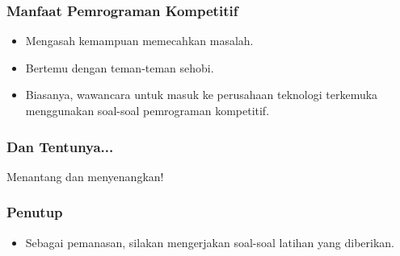 \begin{frame}
\frametitle{Manfaat Pemrograman Kompetitif}
\begin{itemize}
  \item Mengasah kemampuan memecahkan masalah.
  \item Bertemu dengan teman-teman sehobi.
  \item Biasanya, wawancara untuk masuk ke perusahaan teknologi terkemuka menggunakan soal-soal pemrograman kompetitif.
\end{itemize}
\end{frame}

\begin{frame}
\frametitle{Dan Tentunya...}
\begin{center}
  {\LARGE Menantang dan menyenangkan!}
\end{center}
\end{frame}

\begin{frame}
\frametitle{Penutup}
\begin{itemize}
  \item Sebagai pemanasan, silakan mengerjakan soal-soal latihan yang diberikan.
\end{itemize}
\end{frame}


